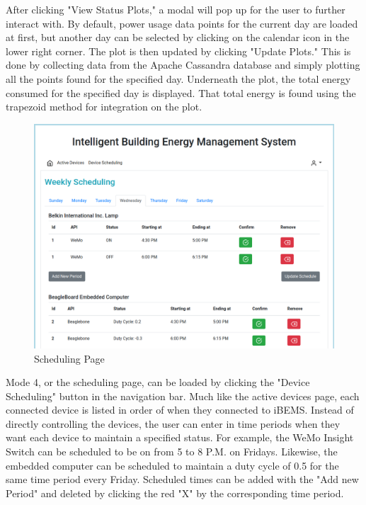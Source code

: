 After clicking "View Status Plots," a modal will pop up for the user to further interact with. By default, power usage data points for the current day are loaded at first, but another day can be selected by clicking on the calendar icon in the lower right corner. The plot is then updated by clicking "Update Plots." This is done by collecting data from the Apache Cassandra database and simply plotting all the points found for the specified day. Underneath the plot, the total energy consumed for the specified day is displayed. That total energy is found using the trapezoid method for integration on the plot.

\begin{figure}[H]
    \centering
    \includegraphics[scale=0.35]{figs/Applications_screen.png}
    \caption{Scheduling Page}
    \label{fig:schedulingl}
\end{figure}

Mode 4, or the scheduling page, can be loaded by clicking the "Device Scheduling" button in the navigation bar. Much like the active devices page, each connected device is listed in order of when they connected to iBEMS. Instead of directly controlling the devices, the user can enter in time periods when they want each device to maintain a specified status. For example, the WeMo Insight Switch can be scheduled to be on from 5 to 8 P.M. on Fridays. Likewise, the embedded computer can be scheduled to maintain a duty cycle of 0.5 for the same time period every Friday. Scheduled times can be added with the "Add new Period" and deleted by clicking the red "X" by the corresponding time period.